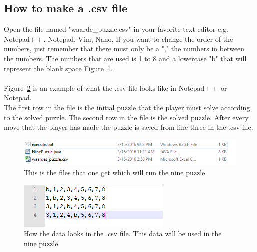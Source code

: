 \documentclass[10pt]{article}
\begin{document}
\subsection{How to make a .csv file}
Open the file named "waarde\_puzzle.csv" in your favorite text editor e.g. Notepad$++$, Notepad, Vim, Nano.
If you want to change the order of the numbers, just remember that there must only be a "," the numbers in between the numbers. The numbers that are used is 1 to 8 and a lowercase "b" that will represent the blank space Figure~\ref{csv}.
\\
\\Figure~\ref{waardes} is an example of what the .csv file looks like in Notepad$++$ or Notepad. \\The first row in the file is the initial puzzle that the player must solve according to the solved puzzle. The second row in the file is the solved puzzle. After every move that the player has made the puzzle is saved from line three in the .csv file.  
\begin{figure}
\centering
\includegraphics[scale=0.7]{./Prente/csv.png}
\caption{This is the files that one get which will run the nine puzzle}
\label{csv}
\end{figure}
\begin{figure}
\centering
\includegraphics[scale=1]{./Prente/waardes.png}
\caption{How the data looks in the .csv file. This data will be used in the nine puzzle.}
\label{waardes}
\end{figure}
\FloatBarrier
\end{document}
